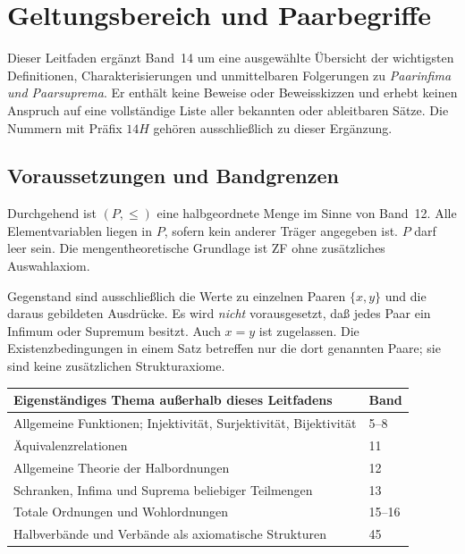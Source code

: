 \chapter{Geltungsbereich und Paarbegriffe}
\label{b14guide:ch:foundations}

Dieser Leitfaden ergänzt Band~14 um eine ausgewählte Übersicht der
wichtigsten Definitionen, Charakterisierungen und unmittelbaren
Folgerungen zu \emph{Paarinfima und Paarsuprema}. Er enthält keine
Beweise oder Beweisskizzen und erhebt keinen Anspruch auf eine
vollständige Liste aller bekannten oder ableitbaren Sätze.
Die Nummern mit Präfix $14H$ gehören ausschließlich zu dieser Ergänzung.

\section{Voraussetzungen und Bandgrenzen}

Durchgehend ist $(P,\leq)$ eine halbgeordnete Menge im Sinne von
Band~12. Alle Elementvariablen liegen in $P$, sofern kein anderer
Träger angegeben ist. $P$ darf leer sein. Die mengentheoretische
Grundlage ist ZF ohne zusätzliches Auswahlaxiom.

Gegenstand sind ausschließlich die Werte zu einzelnen Paaren
$\{x,y\}$ und die daraus gebildeten Ausdrücke.
Es wird \emph{nicht} vorausgesetzt, daß jedes Paar ein Infimum
oder Supremum besitzt. Auch $x=y$ ist zugelassen.
Die Existenzbedingungen in einem Satz betreffen nur die dort
genannten Paare; sie sind keine zusätzlichen Strukturaxiome.

\begin{center}
\small
\begin{tabularx}{\linewidth}{@{}p{.72\linewidth}X@{}}
\toprule
Eigenständiges Thema außerhalb dieses Leitfadens & Band\\
\midrule
Allgemeine Funktionen; Injektivität, Surjektivität, Bijektivität & 5--8\\
Äquivalenzrelationen & 11\\
Allgemeine Theorie der Halbordnungen & 12\\
Schranken, Infima und Suprema beliebiger Teilmengen & 13\\
Totale Ordnungen und Wohlordnungen & 15--16\\
Halbverbände und Verbände als axiomatische Strukturen & 45\\
\bottomrule
\end{tabularx}
\end{center}


